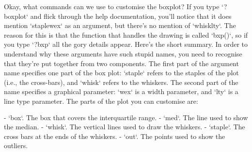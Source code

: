 Okay, what commands can we use to customise the boxplot? If you type `?boxplot` and flick through the help documentation, you'll notice that it does mention `staplewex` as an argument, but there's no mention of `whisklty`. The reason for this is that the function that handles the drawing is called `bxp()`, so if you type `?bxp` all the gory details appear. Here's the short summary. In order to understand why these arguments have such stupid names, you need to recognise that they're put together from two components. The first part of the argument name specifies one part of the box plot: `staple` refers to the staples of the plot (i.e., the cross-bars), and `whisk` refers to the whiskers. The second part of the name specifies a graphical parameter: `wex` is a width parameter, and `lty` is a line type parameter. The parts of the plot you can customise are:
 
- `box`. The box that covers the interquartile range.
- `med`. The line used to show the median.
- `whisk`. The vertical lines used to draw the whiskers. 
- `staple`. The cross bars at the ends of the whiskers.
- `out`. The points used to show the outliers.

